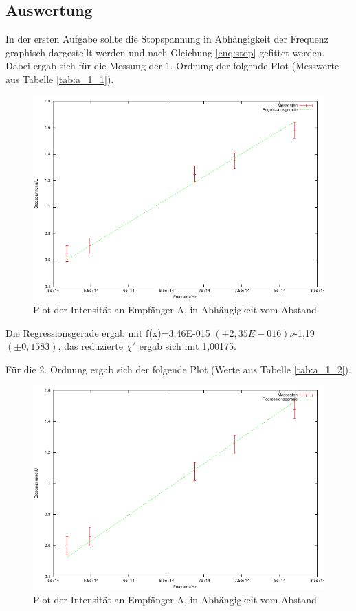 \documentclass[12px]{scrartcl}
\begin{document}
\subsection{Auswertung}
In der ersten Aufgabe sollte die Stopspannung in Abhängigkeit der Frequenz graphisch dargestellt werden und nach Gleichung \ref{enq:stop} gefittet werden. Dabei ergab sich für die Messung der 1. Ordnung der folgende Plot (Messwerte aus Tabelle \ref{tab:a_1_1}).

\begin{figure}[H]
\centering
    \includegraphics[scale = 1]{a_1_1.pdf}
  	\caption[Plot der Stopspannung, in Abhängigkeit der Frequenz]{Plot der Intensität an Empfänger A, in Abhängigkeit vom Abstand}
  \label{fig:a_3_A}
\end{figure}

Die Regressionsgerade ergab mit f(x)=3,46E-015 $(\pm 2,35E-016) \nu$-1,19 $(\pm 0,1583)$, das reduzierte $\chi^2$ ergab sich mit 1,00175.

Für die 2. Ordnung ergab sich der folgende Plot (Werte aus Tabelle \ref{tab:a_1_2}).

\begin{figure}[H]
\centering
    \includegraphics[scale = 1]{a_1_2.pdf}
  	\caption[Plot der Stopspannung, in Abhängigkeit der Frequenz]{Plot der Intensität an Empfänger A, in Abhängigkeit vom Abstand}
  \label{fig:a_3_A}
\end{figure}
\end{document}
